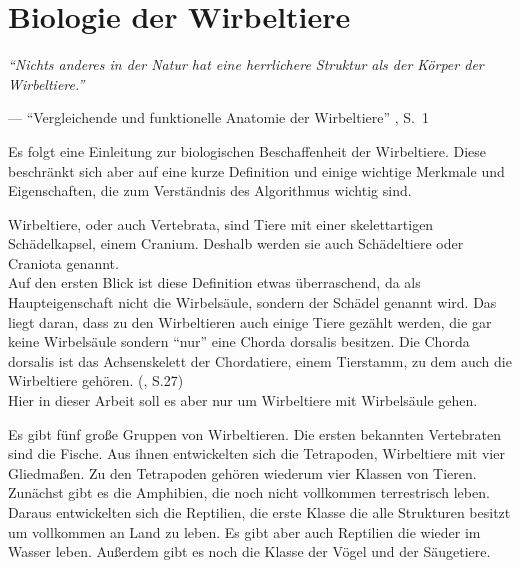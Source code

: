 \chapter{Biologie der Wirbeltiere}
\label{chapter:biology}

\begin{center}
 \begin{minipage}{12cm}
  \emph{"`Nichts anderes in der Natur hat eine herrlichere Struktur als der Körper der Wirbeltiere."'}
 
  --- "`Vergleichende und funktionelle Anatomie der Wirbeltiere"' \cite{Vergleichende_Anatomie}, S.\ 1
 \end{minipage}
\end{center}

Es folgt eine Einleitung zur biologischen Beschaffenheit der Wirbeltiere. Diese beschränkt sich aber auf eine kurze Definition und einige wichtige Merkmale und Eigenschaften, die zum Verständnis des Algorithmus wichtig sind.

Wirbeltiere, oder auch Vertebrata, sind Tiere mit einer skelettartigen Schädelkapsel, einem Cranium. Deshalb werden sie auch Schädeltiere oder Craniota genannt.\\
Auf den ersten Blick ist diese Definition etwas überraschend, da als  Haupteigenschaft nicht die Wirbelsäule, sondern der Schädel genannt wird. Das liegt daran, dass zu den Wirbeltieren auch einige Tiere gezählt werden, die gar keine Wirbelsäule sondern "`nur"' eine Chorda dorsalis besitzen. Die Chorda dorsalis ist das Achsenskelett der Chordatiere, einem Tierstamm, zu dem auch die Wirbeltiere gehören. (\cite{Vergleichende_Anatomie}, S.27)\\ %
Hier in dieser Arbeit soll es aber nur um Wirbeltiere mit Wirbelsäule gehen.

Es gibt fünf große Gruppen von Wirbeltieren. Die ersten bekannten Vertebraten sind die Fische. Aus ihnen entwickelten sich die Tetrapoden, Wirbeltiere mit vier Gliedmaßen. Zu den Tetrapoden gehören wiederum vier Klassen von Tieren. Zunächst gibt es die Amphibien, die noch nicht vollkommen terrestrisch leben. Daraus entwickelten sich die Reptilien, die erste Klasse die alle Strukturen besitzt um vollkommen an Land zu leben. Es gibt aber auch Reptilien die wieder im Wasser leben. Außerdem gibt es noch die Klasse der Vögel und der Säugetiere.

